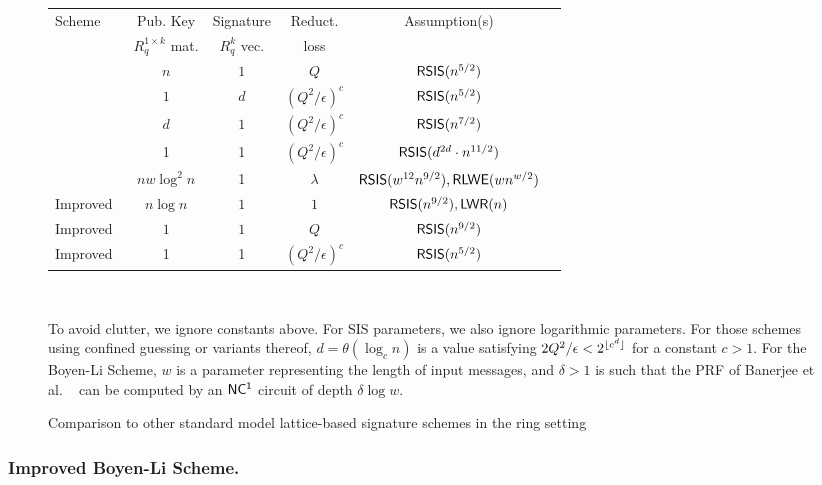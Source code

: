 \begin{figure}[ht]
\label{fig:results-comp}
{\centering
\begin{tabular}{|l|c|c|c|c|c|}
\hline
Scheme&Pub. Key&Signature&Reduct.&Assumption(s)\\
&$R_q^{1 \times k}$ mat.&$R_q^{k}$
vec.&loss&\\
\hline
\cite{DBLP:conf/eurocrypt/MicciancioP12}&$n$&$1$&$Q$&$\mathsf{RSIS}(n^{5/2})$\\
\cite{bohl2013confined}&$1$&$d$&$(Q^2/\epsilon)^c$&$\mathsf{RSIS}(n^{5/2})$\\
\cite{DBLP:conf/crypto/DucasM14}&$d$&$1$&$(Q^2/\epsilon)^c$&$\mathsf{RSIS}(n^{7/2})$\\
\cite{DBLP:conf/pkc/Alperin-Sheriff15}&1&1&$(Q^2/\epsilon)^c$&$\mathsf{RSIS}(d^{2d}\cdot
n^{11/2})$\\
\cite{DBLP:conf/asiacrypt/BoyenL16}&$nw\log^2{n}$&1&$\lambda$&$\mathsf{RSIS}(w^{12}n^{9/2}),\mathsf{RLWE}(wn^{w/2})$\\
\hline
Improved~\cite{DBLP:conf/asiacrypt/BoyenL16}&$n\log{n}$&$1$&$1$&$\mathsf{RSIS}(n^{9/2}),\mathsf{LWR}(n)$\\
Improved~\cite{DBLP:conf/eurocrypt/MicciancioP12}&$1$&$1$&$Q$&$\mathsf{RSIS}(n^{9/2})$\\
Improved \cite{DBLP:conf/pkc/Alperin-Sheriff15}&1&1&$(Q^2/\epsilon)^c$&$\mathsf{RSIS}(n^{5/2})$\\
\hline
\end{tabular}\\}
\medskip 

To avoid clutter, we ignore constants above. For SIS parameters, we also ignore logarithmic parameters. For those schemes
using confined guessing or variants thereof, $d=\theta(\log_c{n})$ is a value
satisfying $2Q^2/\epsilon < 2^{\lfloor c^d\rfloor}$ for a constant $c>1$. For the Boyen-Li Scheme, $w$ is a parameter representing the length of input messages, and $\delta>1$ is such that the PRF of Banerjee et al. ~\cite{DBLP:conf/eurocrypt/BanerjeePR12} can be computed by an $\mathsf{NC^{1}}$ circuit of depth $\delta \log{w}$.
\caption{Comparison to other standard model lattice-based signature
  schemes in the ring setting}
\end{figure}


\subsubsection{Improved Boyen-Li Scheme.}
\label{sec:improved-boyen-li}




